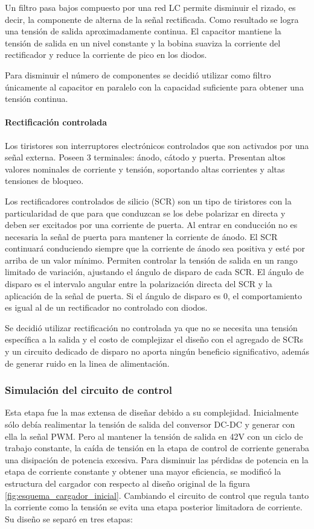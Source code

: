 Un filtro pasa bajos compuesto por una red LC permite disminuir el rizado, es decir, la componente de alterna de la señal rectificada. 
Como resultado se logra una tensión de salida aproximadamente continua.
El capacitor mantiene la tensión de salida en un nivel constante y la bobina suaviza la corriente del rectificador y reduce la corriente de pico en los diodos. 

Para disminuir el número de componentes se decidió utilizar como filtro únicamente al capacitor en paralelo con la capacidad suficiente para obtener una tensión continua.

\paragraph{Rectificación controlada}

Los tiristores son interruptores electrónicos controlados que son activados por una señal externa. 
Poseen 3 terminales: ánodo, cátodo y puerta. Presentan altos valores nominales de corriente y tensión,
soportando altas corrientes y altas tensiones de bloqueo. 

Los rectificadores controlados de silicio (SCR) son un tipo de tiristores con la particularidad de que para que 
conduzcan se los debe polarizar en directa y deben ser excitados por una corriente de puerta. 
Al entrar en conducción no es necesaria la señal de puerta para mantener la corriente de ánodo. 
El SCR continuará conduciendo siempre que la corriente de ánodo sea positiva y esté por arriba de un valor mínimo. 
Permiten controlar la tensión de salida en un rango limitado de variación,
ajustando el ángulo de disparo de cada SCR. 
El ángulo de disparo es el intervalo angular entre la polarización directa del SCR y la aplicación de la señal de puerta. 
Si el ángulo de disparo es 0, el comportamiento es igual al de un rectificador no controlado con diodos. 

Se decidió utilizar rectificación no controlada ya que no se necesita una tensión específica a la salida
y el costo de complejizar el diseño con el agregado de SCRs
y un circuito dedicado de disparo no aporta ningún beneficio significativo,
además de generar ruido en la linea de alimentación.

\subsubsection{Simulación del circuito de control}
Esta etapa fue la mas extensa de diseñar debido a su complejidad.
Inicialmente sólo debía realimentar la tensión de salida del conversor DC-DC y generar con ella la señal PWM. 
Pero al mantener la tensión de salida en 42V con un ciclo de trabajo constante,
la caída de tensión en la etapa de control de corriente generaba una disipación de potencia excesiva.
Para disminuir las pérdidas de potencia en la etapa de corriente constante y obtener una mayor eficiencia,
se modificó la estructura del cargador con respecto al diseño original de la figura \ref{fig:esquema_cargador_inicial}. 
Cambiando el circuito de control que regula tanto la corriente como la tensión
se evita una etapa posterior limitadora de corriente.
Su diseño se separó en tres etapas:

